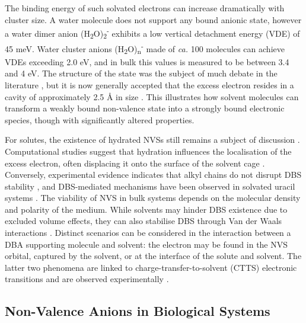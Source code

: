 The binding energy of such solvated electrons can increase dramatically with cluster size. A water molecule does not support any bound anionic state\cite{herbert2015quantum}, however a water dimer anion (H\textsubscript{2}O)\textsubscript{2}\textsuperscript{-} exhibits a low vertical detachment energy (VDE) of 45 meV\cite{coe1990photoelectron}. Water cluster anions (H\textsubscript{2}O)\textsubscript{n}\textsuperscript{-} made of \emph{ca.} 100 molecules can achieve VDEs exceeding 2.0 eV\cite{verlet2005observation}, and in bulk this values is measured to be between 3.4 and 4 eV\cite{coe2008photoelectron,siefermann2010binding}. The structure of the state was the subject of much debate in the literature \cite{kumar2015simple,herbert2019structure,herbert2017hydrated,kevan1981solvated}, but it is now generally accepted that the excess electron resides in a cavity of approximately 2.5 \r{A} in size \cite{herbert2019structure}. This illustrates how solvent molecules can transform a weakly bound non-valence state into a strongly bound electronic species, though with significantly altered properties. 

For solutes, the existence of hydrated NVSs still remains a subject of discussion \cite{anusiewicz2020fate,castellani2019stability,larsen2010does}. Computational studies suggest that hydration influences the localisation of the excess electron, often displacing it onto the surface of the solvent cage \cite{anusiewicz2020fate}. Conversely, experimental evidence indicates that alkyl chains do not disrupt DBS stability \cite{castellani2019stability}, and DBS-mediated mechanisms have been observed in solvated uracil systems \cite{narayanan2024electron}. The viability of NVS in bulk systems depends on the molecular density and polarity of the medium. While solvents may hinder DBS existence due to excluded volume effects, they can also stabilise DBS through Van der Waals interactions \cite{bradforth2002excited,chen2000precursors}. Distinct scenarios can be considered in the interaction between a DBA supporting molecule and solvent: the electron may be found in the NVS orbital, captured by the solvent, or at the interface of the solute and solvent. The latter two phenomena are linked to charge-transfer-to-solvent (CTTS) electronic transitions and are observed experimentally \cite{chen2000precursors,bradforth2002excited,messina2013real,carter2023birth}.

\subsection{Non-Valence Anions in Biological Systems}

